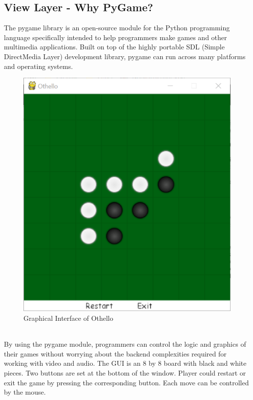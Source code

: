 \documentclass[letterpaper,12pt]{article}
\begin{document}
\subsection{View Layer - Why PyGame?}
The pygame library is an open-source module for the Python programming language specifically intended to help programmers make games and other multimedia applications. Built on top of the highly portable SDL (Simple DirectMedia Layer) development library, pygame can run across many platforms and operating systems.\\
\begin{figure}[!htb]
\centering
\includegraphics[scale=.3]{GUI.eps}
\caption{Graphical Interface of Othello}
\label{fig:digraph}
\end{figure}\\
\noindent
By using the pygame module, programmers can control the logic and graphics of their games without worrying about the backend complexities required for working with video and audio.
\noindent
The GUI is an 8 by 8 board with black and white pieces. Two buttons are set at the bottom of the window. Player could restart or exit the game by pressing the corresponding button. Each move can be controlled by the mouse.
\end{document}

